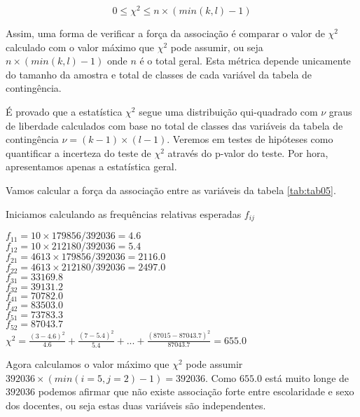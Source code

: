 \documentclass[11pt,]{style/krantz}
\renewenvironment{quote}{\begin{VF}}{\end{VF}}
\theoremstyle{definition}
\theoremstyle{definition}
\theoremstyle{definition}
\theoremstyle{remark}
\let\BeginKnitrBlock\begin \let\EndKnitrBlock\end
\begin{document}
\[0 \le \chi^2 \le n\times(min(k,l)-1)\]

Assim, uma forma de verificar a força da associação é comparar o valor de \(\chi^2\) calculado com o valor máximo que \(\chi^2\) pode assumir, ou seja \(n\times(min(k,l)-1)\) onde \(n\) é o total geral. Esta métrica depende unicamente do tamanho da amostra e total de classes de cada variável da tabela de contingência.

\begin{quote}
É provado que a estatística \(\chi^2\) segue uma distribuição qui-quadrado com \(\nu\) graus de liberdade calculados com base no total de classes das variáveis da tabela de contingência \(\nu = (k-1)\times (l-1)\). Veremos em testes de hipóteses como quantificar a incerteza do teste de \(\chi^2\) através do p-valor do teste. Por hora, apresentamos apenas a estatística geral.
\end{quote}

\BeginKnitrBlock{example}
\protect\hypertarget{exm:unnamed-chunk-89}{}{\label{exm:unnamed-chunk-89} }Vamos calcular a força da associação entre as variáveis da tabela \ref{tab:tab05}.
\EndKnitrBlock{example}

\BeginKnitrBlock{solution}
\iffalse{} {Solução. } \fi{}Iniciamos calculando as frequências relativas esperadas \(f_{ij}\)
\EndKnitrBlock{solution}

\(f_{11} = 10 \times 179856 / 392036 = 4.6\)\\
\(f_{12} = 10 \times 212180 / 392036 = 5.4\)\\
\(f_{21} = 4613 \times 179856 / 392036 = 2116.0\)\\
\(f_{22} = 4613 \times 212180 / 392036 = 2497.0\)\\
\(f_{31} = 33169.8\)\\
\(f_{32} = 39131.2\)\\
\(f_{41} = 70782.0\)\\
\(f_{42} = 83503.0\)\\
\(f_{51} = 73783.3\)\\
\(f_{52} = 87043.7\)\\

\(\chi^2 = \frac{(3-4.6)^2}{4.6} + \frac{(7-5.4)^2}{5.4}+...+\frac{(87015-87043.7)^2}{87043.7} = 655.0\)

Agora calculamos o valor máximo que \(\chi^2\) pode assumir \(392036 \times (min(i=5,j=2)-1) = 392036\). Como \(655.0\) está muito longe de \(392036\) podemos afirmar que não existe associação forte entre escolaridade e sexo dos docentes, ou seja estas duas variáveis são independentes.
\end{document}
